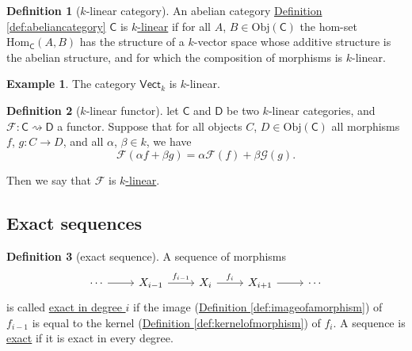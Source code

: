 \documentclass[a4paper,10pt]{scrreprt}
\newcommand{\defn}[1]{\ul{#1}}
\newcommand{\Obj}{\mathrm{Obj}}
\newcommand{\Hom}{\mathrm{Hom}}
\theoremstyle{definition}
\newtheorem{definition}{Definition}[section]
\newtheorem{example}{Example}[section]
\theoremstyle{plain}
\theoremstyle{remark}
\begin{document}
\begin{definition}[$k$-linear category]
  \label{def:linearcategory}
  An abelian category \hyperref[def:abeliancategory]{Definition \ref*{def:abeliancategory}} $\mathsf{C}$ is \defn{$k$-linear} if for all $A$, $B \in \Obj(\mathsf{C})$ the hom-set $\Hom_{\mathsf{C}}(A, B)$ has the structure of a $k$-vector space whose additive structure is the abelian structure, and for which the composition of morphisms is $k$-linear.
\end{definition}

\begin{example}
  The category $\mathsf{Vect}_{k}$ is $k$-linear.
\end{example}

\begin{definition}[$k$-linear functor]
  \label{def:linearfunctor}
  let $\mathsf{C}$ and $\mathsf{D}$ be two $k$-linear categories, and $\mathcal{F}\colon \mathsf{C} \rightsquigarrow \mathsf{D}$ a functor. Suppose that for all objects $C$, $D \in \Obj(\mathsf{C})$ all morphisms $f$, $g\colon C \to D$, and all $\alpha$, $\beta \in k$, we have
  \begin{equation*}
    \mathcal{F}(\alpha f + \beta g) = \alpha \mathcal{F}(f) + \beta \mathcal{G}(g).
  \end{equation*}

  Then we say that $\mathcal{F}$ is \defn{$k$-linear}.
\end{definition}

\subsection{Exact sequences}
\begin{definition}[exact sequence]
  \label{def:exactsequence}
  A sequence of morphisms
  \begin{equation*}
    \begin{tikzcd}
      \cdots
      \arrow[r]
      & X_{i-1}
      \arrow[r, "f_{i-1}"]
      & X_{i}
      \arrow[r, "f_{i}"]
      & X_{i+1}
      \arrow[r]
      & \cdots
    \end{tikzcd}
  \end{equation*}
  is called \defn{exact in degree $i$} if the image (\hyperref[def:imageofamorphism]{Definition \ref*{def:imageofamorphism}}) of $f_{i-1}$ is equal to the kernel (\hyperref[def:kernelofmorphism]{Definition \ref*{def:kernelofmorphism}}) of $f_{i}$. A sequence is \defn{exact} if it is exact in every degree.
\end{definition}
\end{document}
